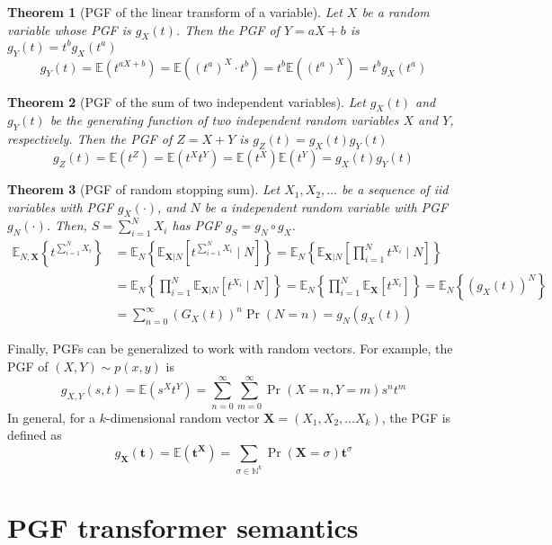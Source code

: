 \documentclass[a4paper]{article}
\newcommand{\E}{ \mathbb{E} }
\newtheorem{theorem}{Theorem}[section]
\begin{document}
\begin{theorem}[PGF of the linear transform of a variable]
	Let \(X\) be a random variable whose PGF is \(g_X(t)\).
	Then the PGF of \(Y=aX+b\) is \(g_Y(t) = t^b g_X(t^a)\)
	\[
		g_Y(t)
		= \E(t^{aX+b})
		= \E({(t^a)}^X \cdot t^b)
		= t^b \E({(t^a)}^X )
		= t^b g_X(t^a)
	\]
\end{theorem}
\begin{theorem}[PGF of the sum of two independent variables]
	Let \(g_X(t)\) and \(g_Y(t)\) be the generating function of two independent random variables \(X\) and \(Y\), respectively. Then the PGF of \(Z=X+Y\) is \(g_Z(t) = g_X(t)g_Y(t)\)
	\[
		g_Z(t) = \E(t^Z) = \E(t^X t^Y) = \E(t^X) \E(t^Y) = g_X(t) g_Y(t)
	\]
\end{theorem}
\begin{theorem}[PGF of random stopping sum]
	Let \(X_1, X_2, \ldots\) be a sequence of iid variables with PGF \(g_X(\cdot)\),
	and \(N\) be a independent random variable with PGF \(g_N(\cdot)\).
	Then, \(S=\sum_{i=1}^{N} X_i\) has PGF \(g_S = g_N\circ g_X\).
	\begin{align*}
		\E_{N,\mathbf{X}}\left\{ t^{\sum_{i=1}^N X_i} \right\}
		 & = \E_N\left\{ \E_{\mathbf{X}|N}\left[ t^{\sum_{i=1}^N X_i} \mid N \right] \right\}
		= \E_N\left\{ \E_{\mathbf{X}|N}\left[ \prod_{i=1}^N t^{X_i} \mid N \right] \right\}     \\
		 & = \E_N\left\{ \prod_{i=1}^N \E_{\mathbf{X}|N}\left[  t^{X_i} \mid N \right] \right\}
		= \E_N\left\{ \prod_{i=1}^N \E_{\mathbf{X}}\left[  t^{X_i} \right] \right\}
		= \E_N\left\{ {(g_X(t))}^N \right\}                                                     \\
		 & = \sum_{n=0}^{\infty} {(G_X(t))}^n \Pr(N=n)
		= g_N(g_X(t))
	\end{align*}
\end{theorem}

Finally, PGFs can be generalized to work with random vectors.
For example, the PGF of \((X,Y)\sim p(x,y)\) is
\[
	g_{X,Y}(s,t) = \E(s^X t^Y) = \sum_{n=0}^\infty \sum_{m=0}^\infty \Pr(X=n,Y=m) s^n t^m
\]
In general, for a \(k\)-dimensional random vector \(\mathbf{X}=(X_1,X_2,\ldots X_k)\), the PGF is defined as
\[
	g_{\mathbf{X}}(\mathbf{t}) = \E(\mathbf{t}^\mathbf{X}) = \sum_{\sigma\in\mathbb{N}^k} \Pr(\mathbf{X}=\sigma) \mathbf{t}^\sigma
\]

\section{PGF transformer semantics}
\end{document}

